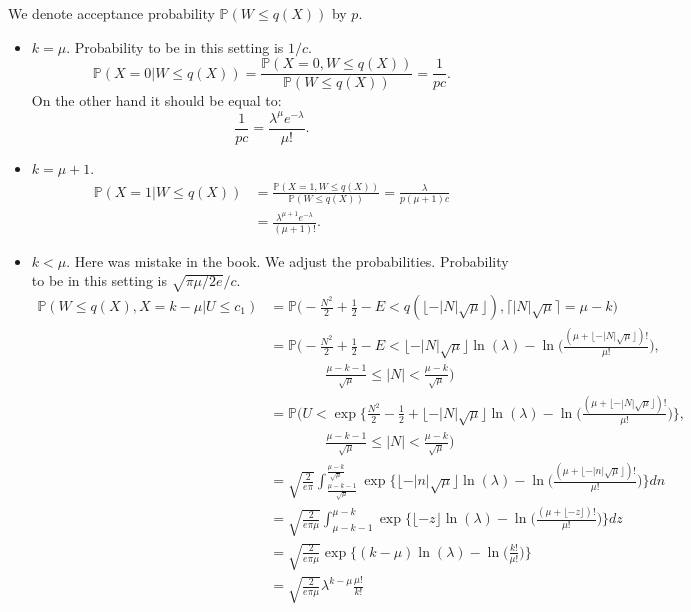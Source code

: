 \documentclass[a4paper,11pt]{article}
\theoremstyle{plain}
\theoremstyle{definition}
\newcommand{\MP}{\mathbb{P}}
\begin{document}
	We denote acceptance probability $\MP(W \leq q(X))$ by $p$.
	\begin{itemize}
		
		\item $k = \mu$. Probability to be in this setting is $1 / c$.
		\[\MP(X = 0 | W \leq q(X)) = \frac{\MP(X = 0, W \leq q(X))}{\MP(W \leq q(X))} = \frac{1}{pc}. \]
		On the other hand it should be equal to:
		\[ \frac{1}{pc} = \frac{\lambda^\mu e^{-\lambda}}{\mu!}. \]
		\item $k = \mu + 1$.
		\[
		\begin{aligned}
		\MP(X = 1 | W \leq q(X)) &= \frac{\MP(X = 1, W \leq q(X))}{\MP(W \leq q(X))} = \frac{\lambda}{p(\mu + 1) c} \\
		&= \frac{\lambda^{\mu+1} e^{-\lambda}}{(\mu + 1)!}.
		\end{aligned}
	    \]
		
		
		\item $k < \mu$. Here was mistake in the book. We adjust the probabilities. Probability to be in this setting is $\sqrt{\pi \mu / 2 e} / c$.
		\[
		\begin{aligned}
		\MP(W \leq q(X), X = k - \mu | U \leq c_1) &= \MP\Bigg(-\frac{N^2}{2} + \frac{1}{2} - E < q( \lfloor -|N|\sqrt{\mu} \rfloor ), \lceil |N| \sqrt{\mu} \rceil = \mu-k \Bigg) \\
		& = \MP\Bigg(-\frac{N^2}{2} + \frac{1}{2} - E < \lfloor -|N|\sqrt{\mu} \rfloor \ln(\lambda) - \ln\bigg( \frac{(\mu + \lfloor -|N|\sqrt{\mu} \rfloor)!}{\mu!} \bigg), 
		\\& \qquad\qquad \frac{\mu-k-1}{\sqrt{\mu}} \leq |N| < \frac{\mu-k}{\sqrt{\mu}} \Bigg)	\\
		& = \MP\Bigg(U < \exp \Big \{\frac{N^2}{2}  - \frac{1}{2} + \lfloor -|N|\sqrt{\mu} \rfloor \ln(\lambda) - \ln\bigg( \frac{(\mu + \lfloor -|N|\sqrt{\mu} \rfloor)!}{\mu!} \bigg) \Big\}, 
		\\& \qquad\qquad \frac{\mu-k-1}{\sqrt{\mu}} \leq |N| < \frac{\mu-k}{\sqrt{\mu}}   \Bigg) \\
		&= \sqrt{\frac{2}{e\pi}} \int_{\frac{\mu-k-1}{\sqrt{\mu}}}^{\frac{\mu-k}{\sqrt{\mu}}}  \exp \Big \{ \lfloor -|n|\sqrt{\mu} \rfloor \ln(\lambda) - \ln\bigg( \frac{(\mu + \lfloor -|n|\sqrt{\mu} \rfloor)!}{\mu!} \bigg) \Big\} dn \\
		& = \sqrt{\frac{2}{e\pi \mu}} \int_{\mu-k-1}^{\mu-k}  \exp \Big \{ \lfloor -z \rfloor \ln(\lambda) - \ln\bigg( \frac{(\mu + \lfloor -z \rfloor)!}{\mu!} \bigg) \Big\} dz \\
		& = \sqrt{\frac{2}{e\pi \mu}} \exp \Big \{ (k-\mu) \ln(\lambda) - \ln\bigg( \frac{k!}{\mu!} \bigg) \Big\} \\
		& = \sqrt{\frac{2}{e\pi \mu}} \lambda^{k-\mu} \frac{\mu!}{k!}
		\end{aligned} 
		\]
		

\end{itemize}
\end{document}
